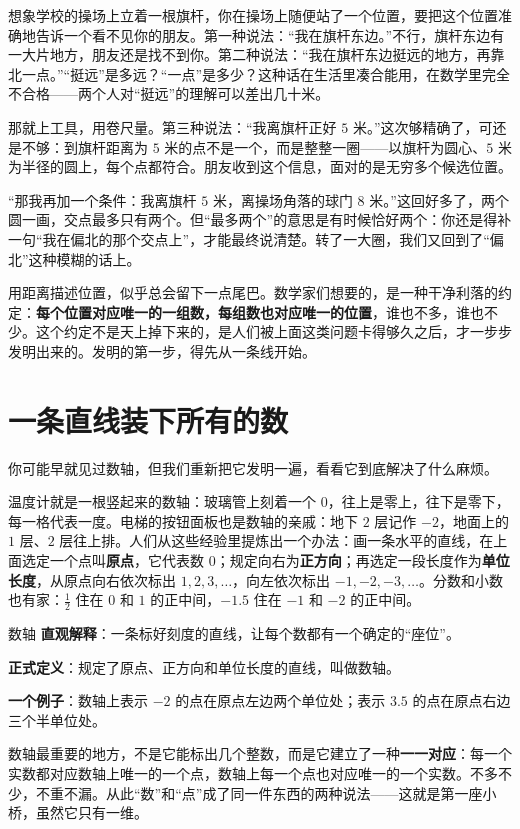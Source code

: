 想象学校的操场上立着一根旗杆，你在操场上随便站了一个位置，要把这个位置准确地告诉一个看不见你的朋友。第一种说法：“我在旗杆东边。”不行，旗杆东边有一大片地方，朋友还是找不到你。第二种说法：“我在旗杆东边挺远的地方，再靠北一点。”“挺远”是多远？“一点”是多少？这种话在生活里凑合能用，在数学里完全不合格——两个人对“挺远”的理解可以差出几十米。

那就上工具，用卷尺量。第三种说法：“我离旗杆正好 $5$ 米。”这次够精确了，可还是不够：到旗杆距离为 $5$ 米的点不是一个，而是整整一圈——以旗杆为圆心、$5$ 米为半径的圆上，每个点都符合。朋友收到这个信息，面对的是无穷多个候选位置。

“那我再加一个条件：我离旗杆 $5$ 米，离操场角落的球门 $8$ 米。”这回好多了，两个圆一画，交点最多只有两个。但“最多两个”的意思是有时候恰好两个：你还是得补一句“我在偏北的那个交点上”，才能最终说清楚。转了一大圈，我们又回到了“偏北”这种模糊的话上。

用距离描述位置，似乎总会留下一点尾巴。数学家们想要的，是一种干净利落的约定：\textbf{每个位置对应唯一的一组数，每组数也对应唯一的位置}，谁也不多，谁也不少。这个约定不是天上掉下来的，是人们被上面这类问题卡得够久之后，才一步步发明出来的。发明的第一步，得先从一条线开始。

\section{一条直线装下所有的数}

你可能早就见过数轴，但我们重新把它发明一遍，看看它到底解决了什么麻烦。

温度计就是一根竖起来的数轴：玻璃管上刻着一个 $0$，往上是零上，往下是零下，每一格代表一度。电梯的按钮面板也是数轴的亲戚：地下 $2$ 层记作 $-2$，地面上的 $1$ 层、$2$ 层往上排。人们从这些经验里提炼出一个办法：画一条水平的直线，在上面选定一个点叫\textbf{原点}，它代表数 $0$；规定向右为\textbf{正方向}；再选定一段长度作为\textbf{单位长度}，从原点向右依次标出 $1,2,3,\dots$，向左依次标出 $-1,-2,-3,\dots$。分数和小数也有家：$\frac{1}{2}$ 住在 $0$ 和 $1$ 的正中间，$-1.5$ 住在 $-1$ 和 $-2$ 的正中间。

\begin{shuyu}{数轴}
\textbf{直观解释}：一条标好刻度的直线，让每个数都有一个确定的“座位”。

\textbf{正式定义}：规定了原点、正方向和单位长度的直线，叫做数轴。

\textbf{一个例子}：数轴上表示 $-2$ 的点在原点左边两个单位处；表示 $3.5$ 的点在原点右边三个半单位处。
\end{shuyu}

数轴最重要的地方，不是它能标出几个整数，而是它建立了一种\textbf{一一对应}：每一个实数都对应数轴上唯一的一个点，数轴上每一个点也对应唯一的一个实数。不多不少，不重不漏。从此“数”和“点”成了同一件东西的两种说法——这就是第一座小桥，虽然它只有一维。

